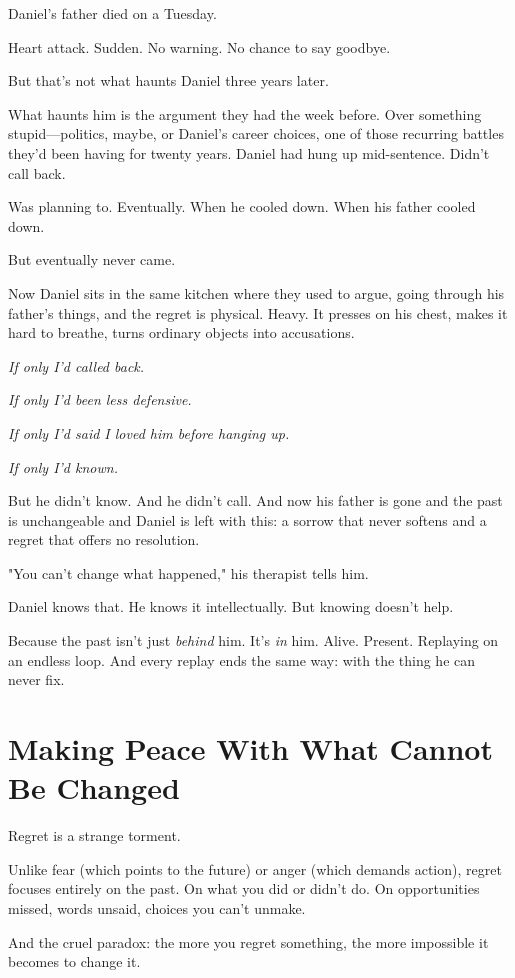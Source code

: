 \documentclass[11pt,twoside]{book}
\begin{document}
Daniel's father died on a Tuesday.

Heart attack. Sudden. No warning. No chance to say goodbye.

But that's not what haunts Daniel three years later.

What haunts him is the argument they had the week before. Over something stupid—politics, maybe, or Daniel's career choices, one of those recurring battles they'd been having for twenty years. Daniel had hung up mid-sentence. Didn't call back.

Was planning to. Eventually. When he cooled down. When his father cooled down.

But eventually never came.

Now Daniel sits in the same kitchen where they used to argue, going through his father's things, and the regret is physical. Heavy. It presses on his chest, makes it hard to breathe, turns ordinary objects into accusations.

\emph{If only I'd called back.}

\emph{If only I'd been less defensive.}

\emph{If only I'd said I loved him before hanging up.}

\emph{If only I'd known.}

But he didn't know. And he didn't call. And now his father is gone and the past is unchangeable and Daniel is left with this: a sorrow that never softens and a regret that offers no resolution.

"You can't change what happened," his therapist tells him.

Daniel knows that. He knows it intellectually. But knowing doesn't help.

Because the past isn't just \emph{behind} him. It's \emph{in} him. Alive. Present. Replaying on an endless loop. And every replay ends the same way: with the thing he can never fix.

\section*{Making Peace With What Cannot Be Changed}

Regret is a strange torment.

Unlike fear (which points to the future) or anger (which demands action), regret focuses entirely on the past. On what you did or didn't do. On opportunities missed, words unsaid, choices you can't unmake.

And the cruel paradox: the more you regret something, the more impossible it becomes to change it.
\end{document}
